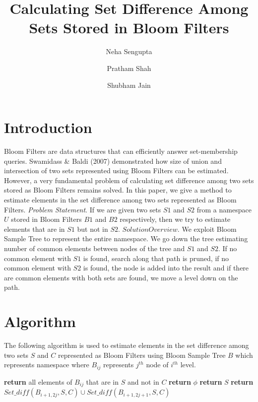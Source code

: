 \documentclass[a4paper]{article}
\title{Calculating Set Difference Among Sets Stored in Bloom Filters}
\author{Neha Sengupta \and Pratham Shah \and Shubham Jain}
\begin{document}
\maketitle

\section{Introduction}
Bloom Filters {\cite{2}} are data structures that can efficiently answer set-membership queries.  Swamidass \& Baldi (2007) {\cite{3}} demonstrated how size of union and intersection of two sets represented using Bloom Filters can be estimated. However, a very fundamental problem of calculating set difference among two sets stored as Bloom Filters remains solved. In this paper, we give a method to estimate elements in the set difference among two sets represented as Bloom Filters. \newline
\textit{Problem Statement}. If we are given two sets $S1$ and $S2$ from a namespace $U$ stored in Bloom Filters $B1$ and $B2$ respectively, then we try to estimate elements that are in $S1$ but not in $S2$. \newline
$Solution Overview.$ We exploit Bloom Sample Tree {\cite{1}} to represent the entire namespace. We go down the tree estimating number of common elements between nodes of the tree and $S1$ and $S2$. If no common element with $S1$ is found, search along that path is pruned, if no common element with $S2$ is found, the node is added into the result and if there are common elements with both sets are found, we move a level down on the path.

\section{Algorithm}
The following algorithm is used to estimate elements in the set difference among two sets $S$ and $C$ represented as Bloom Filters using Bloom Sample Tree $B$ which represents namespace where $B_{ij}$ represents $j^{th}$ node of $i^{th}$ level.

\begin{algorithm}
\caption{$Set\_diff (B_{ij}, S, C)$}
\begin{algorithmic}[1]
    \State \textbf{return} all elements of $B_{ij}$ that are in $S$ and not in $C$
    \State  \textbf{return} $\phi$
    \State  \textbf{return} $S$
    \Else 
    \State
    \textbf{return} $Set\_diff (B_{i+1,2j}, S, C) \cup Set\_diff (B_{i+1,2j+1}, S, C)$
  \EndIf
\EndProcedure
\end{algorithmic}
\end{algorithm}
\end{document}
